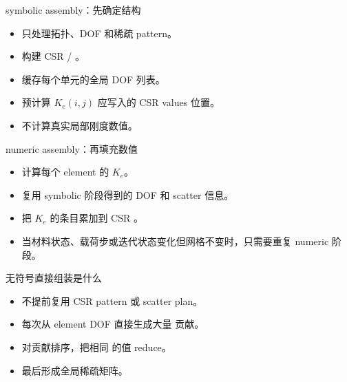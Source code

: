 \begin{frame}{symbolic assembly：先确定结构}
\begin{itemize}
  \item 只处理拓扑、DOF 和稀疏 pattern。
  \item 构建 CSR  / 。
  \item 缓存每个单元的全局 DOF 列表。
  \item 预计算 $K_e(i,j)$ 应写入的 CSR values 位置。
  \item 不计算真实局部刚度数值。
\end{itemize}
\end{frame}

\begin{frame}{numeric assembly：再填充数值}
\begin{itemize}
  \item 计算每个 element 的 $K_e$。
  \item 复用 symbolic 阶段得到的 DOF 和 scatter 信息。
  \item 把 $K_e$ 的条目累加到 CSR 。
  \item 当材料状态、载荷步或迭代状态变化但网格不变时，只需要重复 numeric 阶段。
\end{itemize}
\end{frame}

\begin{frame}{无符号直接组装是什么}
\begin{itemize}
  \item 不提前复用 CSR pattern 或 scatter plan。
  \item 每次从 element DOF 直接生成大量  贡献。
  \item 对贡献排序，把相同  的值 reduce。
  \item 最后形成全局稀疏矩阵。
\end{itemize}
\end{frame}

